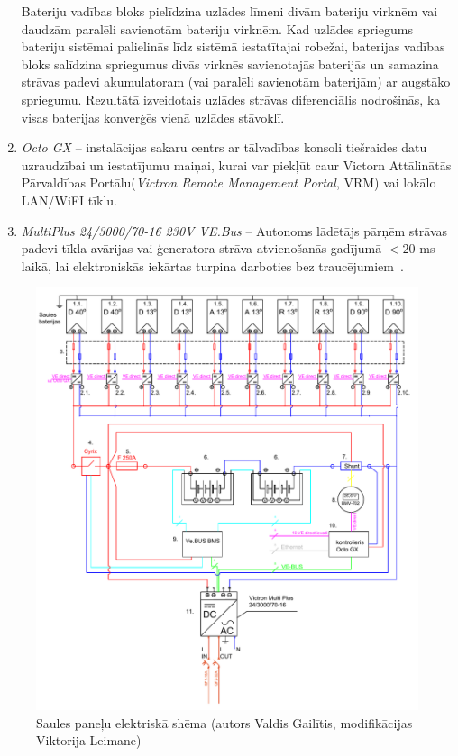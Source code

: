 \begin{enumerate}
Bateriju vadības bloks pielīdzina uzlādes līmeni divām bateriju virknēm vai daudzām paralēli savienotām bateriju virknēm. Kad uzlādes spriegums bateriju sistēmai palielinās līdz sistēmā iestatītajai robežai, baterijas vadības bloks salīdzina spriegumus divās virknēs savienotajās baterijās un samazina strāvas padevi akumulatoram (vai paralēli savienotām baterijām) ar augstāko spriegumu. Rezultātā izveidotais uzlādes strāvas diferenciālis nodrošinās, ka visas baterijas konverģēs vienā uzlādes stāvoklī.
\item \emph{Octo GX} -- instalācijas sakaru centrs ar tālvadības konsoli tiešraides datu uzraudzībai un iestatījumu maiņai, kurai var piekļūt caur Victorn Attālinātās Pārvaldības Portālu(\textit{Victron Remote Management Portal}, VRM) vai lokālo LAN/WiFI tīklu.
\item \emph{MultiPlus 24/3000/70-16 230V VE.Bus}  --
Autonoms lādētājs pārņēm strāvas padevi tīkla avārijas vai ģeneratora strāva atvienošanās gadījumā $<20$ ms laikā, lai elektroniskās iekārtas turpina darboties bez traucējumiem~\cite{victron}. 
\end{enumerate}

\begin{figure}[h]
    \centering
    \includegraphics[width=0.7\linewidth]{figures/misc/shema.pdf}
    \caption{Saules paneļu elektriskā shēma (autors Valdis Gailītis, modifikācijas Viktorija Leimane)}
    \label{fig:shema}
\end{figure}

